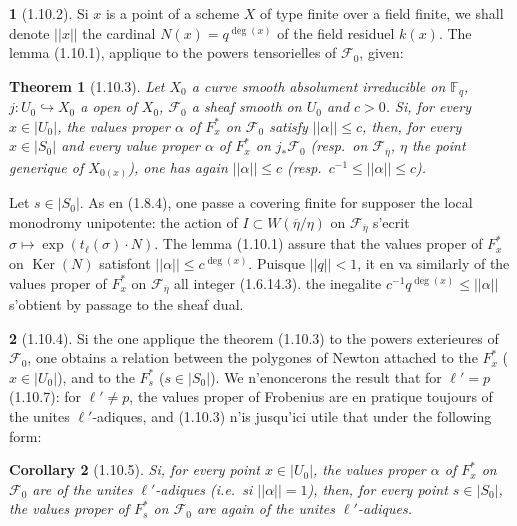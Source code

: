 \documentclass[12pt,a4paper]{article}
\theoremstyle{plain}
\newtheorem{theorem}{Theorem}[section]
\newtheorem{corollary}[theorem]{Corollary}
\theoremstyle{definition}
\theoremstyle{definition}
\newtheorem{para}{}[section]
\theoremstyle{remark}
\DeclareMathOperator{\Ker}{Ker}
\begin{document}
\begin{para}[1.10.2]
Si $x$ is a point of a scheme $X$ of type finite over a field finite, we shall denote $||x||$ the cardinal $N(x) = q^{\deg(x)}$ of the field residuel $k(x)$. The lemma (1.10.1), applique to the powers tensorielles of $\mathscr{F}_0$, given:
\end{para}

\begin{theorem}[1.10.3]
Let $X_0$ a curve smooth absolument irreducible on $\mathbb{F}_q$, $j: U_0 \hookrightarrow X_0$ a open of $X_0$, $\mathscr{F}_0$ a sheaf smooth on $U_0$ and $c > 0$. Si, for every $x \in |U_0|$, the values proper $\alpha$ of $F_x^*$ on $\mathscr{F}_0$ satisfy $||\alpha|| \leq c$, then, for every $x \in |S_0|$ and every value proper $\alpha$ of $F_x^*$ on $j_* \mathscr{F}_0$ (resp.~on $\mathscr{F}_{\overline{\eta}}$, $\eta$ the point generique of $X_{0(x)}$), one has again $||\alpha|| \leq c$ (resp.~$c^{-1} \leq ||\alpha|| \leq c$).
\end{theorem}

Let $s \in |S_0|$. As en (1.8.4), one passe a covering finite for supposer the local monodromy unipotente: the action of $I \subset W(\overline{\eta}/\eta)$ on $\mathscr{F}_{\overline{\eta}}$ s'ecrit $\sigma \mapsto \exp(t_\ell(\sigma) \cdot N)$. The lemma (1.10.1) assure that the values proper of $F_x^*$ on $\Ker(N)$ satisfont $||\alpha|| \leq c^{\deg(x)}$. Puisque $||q|| < 1$, it en va similarly of the values proper of $F_x^*$ on $\mathscr{F}_{\overline{\eta}}$ all integer (1.6.14.3). the inegalite $c^{-1} q^{\deg(x)} \leq ||\alpha||$ s'obtient by passage to the sheaf dual.

\begin{para}[1.10.4]
Si the one applique the theorem (1.10.3) to the powers exterieures of $\mathscr{F}_0$, one obtains a relation between the polygones of Newton attached to the $F_x^*$ ($x \in |U_0|$), and to the $F_s^*$ ($s \in |S_0|$). We n'enoncerons the result that for $\ell' = p$ (1.10.7): for $\ell' \neq p$, the values proper of Frobenius are en pratique toujours of the unites $\ell'$-adiques, and (1.10.3) n'is jusqu'ici utile that under the following form:
\end{para}

\begin{corollary}[1.10.5]
Si, for every point $x \in |U_0|$, the values proper $\alpha$ of $F_x^*$ on $\mathscr{F}_0$ are of the unites $\ell'$-adiques (i.e.~si $||\alpha|| = 1$), then, for every point $s \in |S_0|$, the values proper of $F_s^*$ on $\mathscr{F}_0$ are again of the unites $\ell'$-adiques.
\end{corollary}
\end{document}
